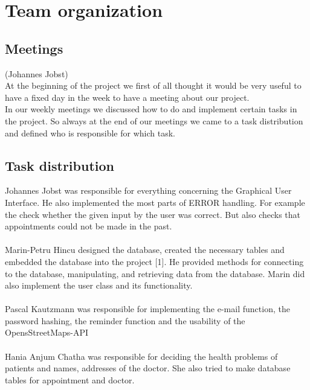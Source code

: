 \documentclass[a4paper, 12pt]{report}
\begin{document}
\chapter{Team organization}
\section{Meetings}
{\tiny (Johannes Jobst)\\}
At the beginning of the project we first of all thought it would be very useful 
to have a fixed day in the week to have a meeting about our project. \\
In our weekly meetings we discussed how to do and implement certain tasks in the project.
So always at the end of our meetings we came to a task distribution and defined who is
responsible for which task. 
\section{Task distribution}
Johannes Jobst was responsible for everything concerning the Graphical User Interface.
He also implemented the most parts of ERROR handling. For example the check whether the given
input by the user was correct. But also checks that appointments could not be made in the past. \\ \\
Marin-Petru Hincu designed the database, created the necessary tables and embedded the database into the project [1]. He provided methods for connecting to the database, manipulating, and retrieving data from the database. Marin did also implement the user class and its functionality. \\ \\
Pascal Kautzmann was responsible for implementing the e-mail function, the password hashing, the reminder function and the usability of the OpensStreetMaps-API \\ 
	\\
Hania Anjum Chatha was responsible for deciding the health problems of patients and names, addresses of the doctor. She also tried to make database tables for appointment and doctor.
\end{document}
